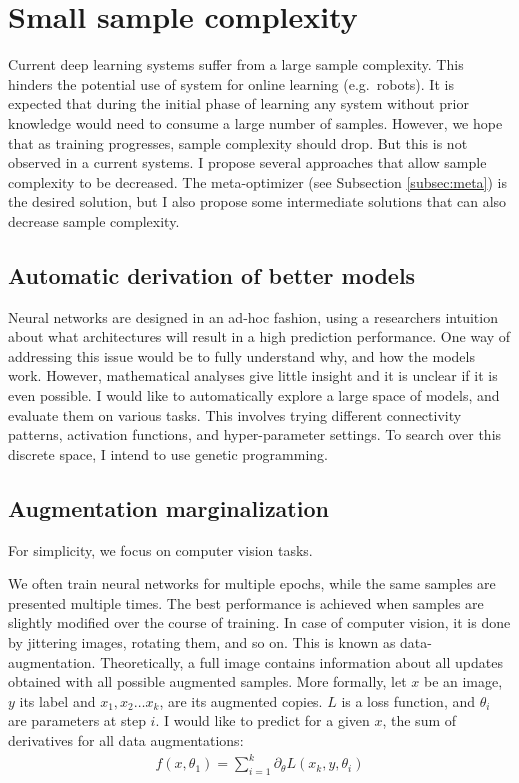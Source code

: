 \documentclass{article}
\begin{document}
\section{Small sample complexity}
Current deep learning systems suffer from a large sample
complexity. This hinders the potential use of system for online 
learning (e.g.~robots). It is expected that during the initial phase of 
learning any system without prior knowledge would need to consume a large number of samples. 
However, we hope that as training progresses, sample complexity should drop. But this is 
not observed in a current systems. I propose several approaches that
allow sample complexity to be decreased. 
The meta-optimizer (see Subsection \ref{subsec:meta}) is the desired
solution, but I also propose some intermediate solutions that can also
decrease sample complexity.

\subsection{Automatic derivation of better models}
Neural networks are designed in an ad-hoc fashion, using a researchers
intuition about what architectures will result in a high prediction
performance. One way of addressing this issue would be to
fully understand why, and how the models work. However, mathematical
analyses give little insight and it is unclear if it is even 
possible. I would like to automatically
explore a large space of models, and evaluate them on various tasks. 
This involves trying different connectivity patterns, activation
functions, and hyper-parameter settings. To search over this discrete
space, I intend to use genetic programming. 


\subsection{Augmentation marginalization}
For simplicity, we focus on computer vision tasks.

We often train neural networks for multiple epochs, while the same 
samples are presented multiple times. The best performance is
achieved when samples are slightly modified over the course of training.
In case of computer vision, it is done by jittering images, rotating
them, and so on. This is known as data-augmentation. 
Theoretically, a full image contains information about all updates obtained
with all possible augmented samples. More formally, let $x$ be an image, $y$ its label and
$x_1, x_2 \dots x_k$, are its augmented copies. $L$ is a loss function, and $\theta_i$ are parameters at step $i$.
I would like to
predict for a given $x$, the sum of derivatives for all data augmentations:
\begin{align}
f(x, \theta_1) = \sum_{i=1}^k \partial_\theta L(x_k, y, \theta_i)
\end{align}
\end{document}
